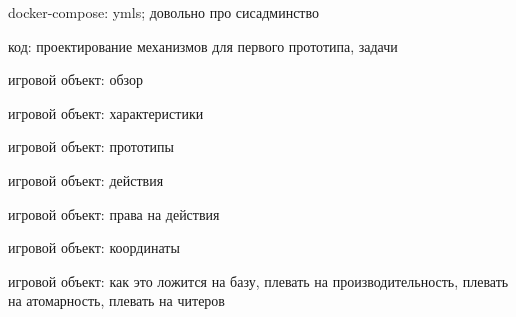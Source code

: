 \documentclass[aspectratio=169,handout,bigger]{beamer}
\begin{document}

\begin{frame}{docker-compose: ymls; довольно про сисадминство}
\end{frame}


\begin{frame}{код: проектирование механизмов для первого прототипа, задачи}
\end{frame}


\begin{frame}{игровой объект: обзор}
\end{frame}


\begin{frame}{игровой объект: характеристики}
\end{frame}


\begin{frame}{игровой объект: прототипы}
\end{frame}


\begin{frame}{игровой объект: действия}
\end{frame}


\begin{frame}{игровой объект: права на действия}
\end{frame}


\begin{frame}{игровой объект: координаты}
\end{frame}


\begin{frame}{игровой объект: как это ложится на базу, плевать на производительность, плевать на атомарность, плевать на читеров}
\end{frame}
\end{document}
